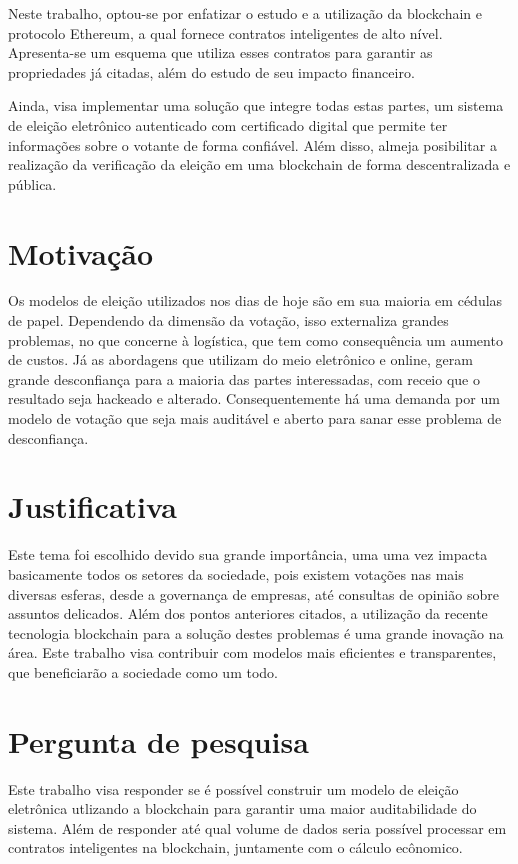 \documentclass{ufsctex/ufsctex}
\begin{document}
Neste trabalho, optou-se por enfatizar o estudo e a utilização da blockchain e protocolo
Ethereum, a qual fornece contratos inteligentes de alto nível\cite{ethereum}.
Apresenta-se um esquema que utiliza esses contratos para garantir as propriedades já citadas,
além do estudo de seu impacto financeiro.

Ainda, visa implementar uma solução que integre todas estas partes, um sistema
de eleição eletrônico autenticado com certificado digital que permite ter informações
sobre o votante de forma confiável. Além disso, almeja posibilitar a realização da verificação
da eleição em uma blockchain de forma descentralizada e pública.

\section{Motivação}

Os modelos de eleição utilizados nos dias de hoje são em sua maioria em cédulas
de papel. Dependendo da dimensão da votação, isso externaliza grandes problemas,
no que concerne à logística, que tem como consequência um aumento de custos. Já
as abordagens que utilizam do meio eletrônico e online, geram grande desconfiança
para a maioria das partes interessadas, com receio que o resultado seja hackeado
e alterado. Consequentemente há uma demanda por um modelo de votação que seja
mais auditável e aberto para sanar esse problema de desconfiança.

\section{Justificativa}

Este tema foi escolhido devido sua grande importância, uma uma vez impacta basicamente
todos os setores da sociedade, pois existem votações nas mais diversas esferas,
desde a governança de empresas, até consultas de opinião sobre assuntos delicados.
Além dos pontos anteriores citados, a utilização da recente tecnologia blockchain
para a solução destes problemas é uma grande inovação na área. Este trabalho visa
contribuir com modelos mais eficientes e transparentes, que beneficiarão a sociedade
como um todo.

\section{Pergunta de pesquisa}

Este trabalho visa responder se é possível construir um modelo de eleição
eletrônica utlizando a blockchain para garantir uma maior auditabilidade
do sistema. Além de responder até qual volume de dados seria possível processar
em contratos inteligentes na blockchain, juntamente com o cálculo ecônomico.
\end{document}
